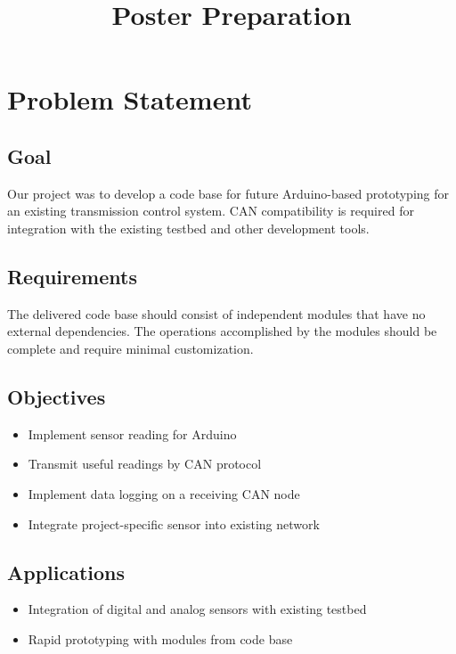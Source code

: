 \documentclass[12pt]{article}
\begin{document}
\title{Poster Preparation}
\date{}
\maketitle
\section{Problem Statement}
\subsection{Goal}
Our project was to develop a code base for future Arduino-based prototyping for
an existing transmission control system. CAN compatibility is required for 
integration with the existing testbed and other development tools. 

\subsection{Requirements}
The delivered code base should consist of independent modules that have no external
dependencies. The operations accomplished by the modules should be complete and 
require minimal customization.

\subsection{Objectives}
\begin{itemize}
	\item	Implement sensor reading for Arduino
	\item	Transmit useful readings by CAN protocol
	\item	Implement data logging on a receiving CAN node
	\item	Integrate project-specific sensor into existing network
\end{itemize}

\subsection{Applications}
\begin{itemize}
	\item	Integration of digital and analog sensors with existing testbed
	\item	Rapid prototyping with modules from code base
\end{itemize}
\end{document}
